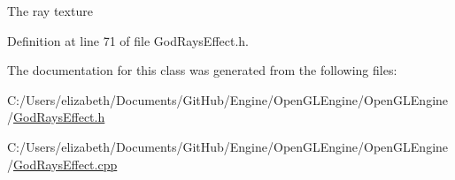 The ray texture 



Definition at line 71 of file God\+Rays\+Effect.\+h.



The documentation for this class was generated from the following files\+:\begin{DoxyCompactItemize}
\item 
C\+:/\+Users/elizabeth/\+Documents/\+Git\+Hub/\+Engine/\+Open\+G\+L\+Engine/\+Open\+G\+L\+Engine/\hyperlink{_god_rays_effect_8h}{God\+Rays\+Effect.\+h}\item 
C\+:/\+Users/elizabeth/\+Documents/\+Git\+Hub/\+Engine/\+Open\+G\+L\+Engine/\+Open\+G\+L\+Engine/\hyperlink{_god_rays_effect_8cpp}{God\+Rays\+Effect.\+cpp}\end{DoxyCompactItemize}
